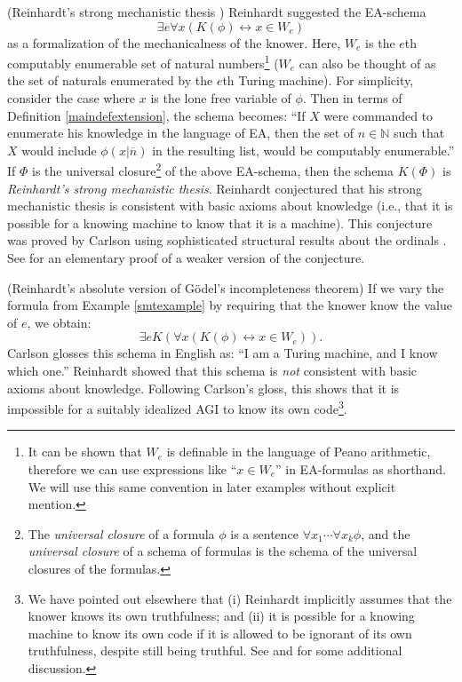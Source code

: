 \documentclass[runningheads]{llncs}
\begin{document}
\begin{example}
\label{smtexample}
    (Reinhardt's strong mechanistic thesis
    \cite{reinhardt1985absolute} \cite{reinhardt1986epistemic}
    \cite{carlson}) Reinhardt suggested the
    EA-schema
    \[\exists e \forall x ( K(\phi) \leftrightarrow x\in W_e)\]
    as a formalization of the mechanicalness of the knower. Here, $W_e$
    is the $e$th computably enumerable set of natural numbers\footnote{It can be
    shown that $W_e$ is definable in the language of Peano arithmetic, therefore we
    can use expressions like ``$x\in W_e$'' in EA-formulas as shorthand. We will
    use this same convention in later
    examples without explicit mention.} ($W_e$ can also
    be thought of as the set of naturals enumerated by the $e$th Turing machine).
    For simplicity, consider the case where $x$ is the lone free variable
    of $\phi$. Then in terms of Definition \ref{maindefextension}, the schema
    becomes:
    ``If $X$ were commanded to enumerate his knowledge in the language of EA,
    then the set of $n\in\mathbb N$ such that $X$ would include $\phi(x|\overline n)$
    in the resulting list, would be computably enumerable.''
    If $\Phi$ is the universal closure\footnote{The \emph{universal closure} of
    a formula $\phi$ is a sentence $\forall x_1\cdots\forall x_k\phi$,
    and the \emph{universal closure} of a schema of formulas is the schema
    of the universal closures of the formulas.} of the above EA-schema, then the
    schema $K(\Phi)$ is \emph{Reinhardt's
    strong mechanistic thesis}. Reinhardt conjectured that his strong mechanistic
    thesis is consistent with basic axioms about knowledge (i.e., that it is
    possible for a knowing machine to know that it is a machine).
    This conjecture was proved by Carlson \cite{carlson} using sophisticated
    structural results about the ordinals \cite{carlson1999}.
    See \cite{alexander2015fast} for an elementary proof of a weaker
    version of the conjecture.
\end{example}

\begin{example}
\label{reinhardtnegativeexample}
  (Reinhardt's absolute version of G\"odel's incompleteness theorem)
  If we vary the formula from Example \ref{smtexample} by requiring that the
  knower know the value of $e$, we obtain:
  \[
    \exists e K(\forall x ( K(\phi) \leftrightarrow x\in W_e)).
  \]
  Carlson \cite{carlson} glosses this schema in English as:
  ``I am a Turing machine, and I know which one.''
  Reinhardt showed that this schema is \emph{not} consistent with basic
  axioms about knowledge. Following Carlson's gloss, this shows
  that it is impossible for a suitably idealized AGI to know its own code\footnote{We have
  pointed out elsewhere \cite{alexander2014machine} that (i) Reinhardt
  implicitly assumes that the knower knows its own truthfulness; and (ii)
  it is possible for a knowing machine to know its own code if it is allowed to
  be ignorant of its own truthfulness, despite still being truthful.
  See \cite{aldini2015self} and \cite{aldini2015theory} for some additional discussion.}.
\end{example}
\end{document}
